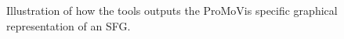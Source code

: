 \begin{figure}
\caption{Illustration of how the tools outputs the ProMoVis specific graphical representation of an SFG.}
\label{fig:promosfg}
\end{figure}
%  
